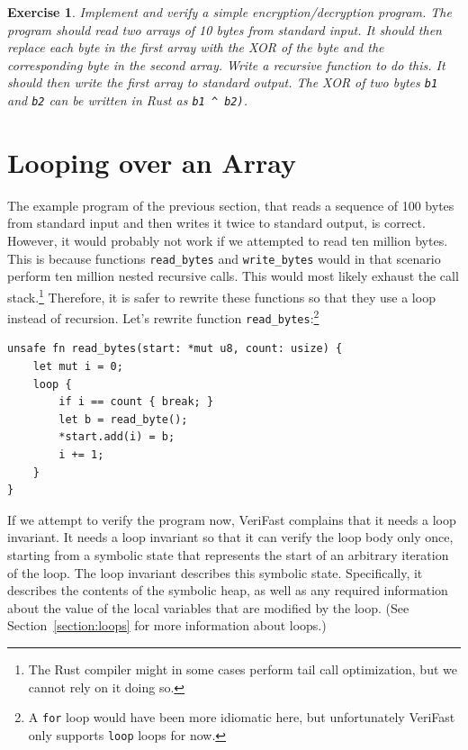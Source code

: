 \documentclass{article}
\newtheorem{exercise}{Exercise}
\begin{document}
\begin{exercise}\label{exercise:xor}
Implement and verify a simple encryption/decryption program. The program should read two arrays of 10 bytes from standard input.
It should then replace each byte in the first array with the XOR of the byte and the corresponding byte in the second array. Write a recursive function to do this.
It should then write the first array to standard output. The XOR of two bytes \lstinline!b1! and \lstinline!b2! can be written in Rust as \lstinline!b1 ^ b2)!.
\end{exercise}

\section{Looping over an Array}\label{section:array-loops}

The example program of the previous section, that reads a sequence of 100 bytes from standard input and then writes it twice to standard output,
is correct. However, it would probably not work if we attempted to read ten million bytes. This is because functions \lstinline!read_bytes! and
\lstinline!write_bytes! would in that scenario perform ten million nested recursive calls. This would most likely exhaust the call stack.\footnote{The Rust compiler might in some cases perform tail call optimization, but we cannot rely on it doing so.} Therefore, it is safer to rewrite these functions so that
they use a loop instead of recursion. Let's rewrite function \lstinline!read_bytes!:\footnote{A \lstinline|for| loop would have been more idiomatic here, but unfortunately VeriFast only supports \lstinline|loop| loops for now.}
\begin{lstlisting}
unsafe fn read_bytes(start: *mut u8, count: usize) {
    let mut i = 0;
    loop {
        if i == count { break; }
        let b = read_byte();
        *start.add(i) = b;
        i += 1;
    }
}
\end{lstlisting}
If we attempt to verify the program now, VeriFast complains that it needs a loop invariant. It needs a loop invariant so that it can
verify the loop body only once, starting from a symbolic state that represents the start of an arbitrary iteration of the loop. The loop
invariant describes this symbolic state. Specifically, it describes the contents of the symbolic heap, as well as any required information
about the value of the local variables that are modified by the loop. (See Section~\ref{section:loops} for more information about loops.)
\end{document}
